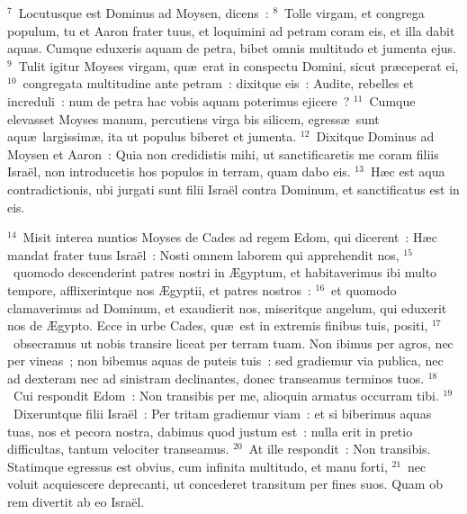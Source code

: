 ${}^{7}$~Locutusque est Dominus ad Moysen, dicens~:
${}^{8}$~Tolle virgam, et congrega populum, tu et Aaron frater tuus, et loquimini ad petram coram eis, et illa dabit aquas. Cumque eduxeris aquam de petra, bibet omnis multitudo et jumenta ejus.
${}^{9}$~Tulit igitur Moyses virgam, qu\ae\ erat in conspectu Domini, sicut pr\ae ceperat ei,
${}^{10}$~congregata multitudine ante petram~: dixitque eis~: Audite, rebelles et increduli~: num de petra hac vobis aquam poterimus ejicere~?
${}^{11}$~Cumque elevasset Moyses manum, percutiens virga bis silicem, egress\ae\ sunt aqu\ae\ largissim\ae , ita ut populus biberet et jumenta.
${}^{12}$~Dixitque Dominus ad Moysen et Aaron~: Quia non credidistis mihi, ut sanctificaretis me coram filiis Isra\"el, non introducetis hos populos in terram, quam dabo eis.
${}^{13}$~H\ae c est aqua contradictionis, ubi jurgati sunt filii Isra\"el contra Dominum, et sanctificatus est in eis.


${}^{14}$~Misit interea nuntios Moyses de Cades ad regem Edom, qui dicerent~: H\ae c mandat frater tuus Isra\"el~: Nosti omnem laborem qui apprehendit nos,
${}^{15}$~quomodo descenderint patres nostri in \AE gyptum, et habitaverimus ibi multo tempore, afflixerintque nos \AE gyptii, et patres nostros~:
${}^{16}$~et quomodo clamaverimus ad Dominum, et exaudierit nos, miseritque angelum, qui eduxerit nos de \AE gypto. Ecce in urbe Cades, qu\ae\ est in extremis finibus tuis, positi,
${}^{17}$~obsecramus ut nobis transire liceat per terram tuam. Non ibimus per agros, nec per vineas~; non bibemus aquas de puteis tuis~: sed gradiemur via publica, nec ad dexteram nec ad sinistram declinantes, donec transeamus terminos tuos.
${}^{18}$~Cui respondit Edom~: Non transibis per me, alioquin armatus occurram tibi.
${}^{19}$~Dixeruntque filii Isra\"el~: Per tritam gradiemur viam~: et si biberimus aquas tuas, nos et pecora nostra, dabimus quod justum est~: nulla erit in pretio difficultas, tantum velociter transeamus.
${}^{20}$~At ille respondit~: Non transibis. Statimque egressus est obvius, cum infinita multitudo, et manu forti,
${}^{21}$~nec voluit acquiescere deprecanti, ut concederet transitum per fines suos. Quam ob rem divertit ab eo Isra\"el.


